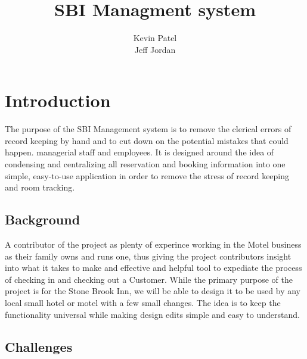 \documentclass[10pt,conference,onecolumn,compsoc]{IEEEtran}
\begin{document}
\title{SBI Managment system}


\author{Kevin Patel\\Jeff Jordan
}

\maketitle

\IEEEdisplaynontitleabstractindextext

\IEEEpeerreviewmaketitle



\section{Introduction}

The purpose of the SBI Management system is to remove the clerical errors of record keeping by hand and to cut down on the potential mistakes that could happen.
managerial staff and employees. It is designed around the idea of condensing and centralizing all reservation and booking information into one simple, easy-to-use application in order to remove the stress of record keeping and room tracking. 



\subsection{Background}
A contributor of the project as plenty of experince working in the Motel business as their family owns and runs one, thus giving the project contributors insight into what it takes to make and effective and helpful tool to expediate the process of checking in and checking out a Customer. 
While the primary purpose of the project is for the Stone Brook Inn, we will be able to design it to be used by any local small hotel or motel with a few small changes. The idea is to keep the functionality universal while making design edits simple and easy to understand. 

\subsection{Challenges}
\end{document}
